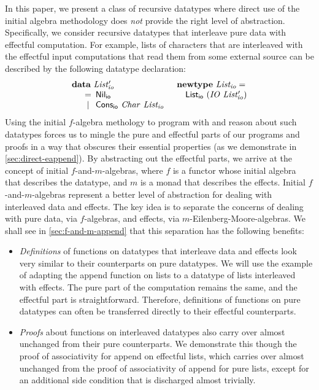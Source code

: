 \documentclass{jfp1}
\newcommand{\kw}[1]{\textbf{#1}}
\begin{document}
In this paper, we present a class of recursive datatypes where direct
use of the initial algebra methodology does \emph{not} provide the
right level of abstraction. Specifically, we consider recursive
datatypes that interleave pure data with effectful computation. For
example, lists of characters that are interleaved with the effectful
input computations that read them from some external source can be
described by the following datatype declaration:
\begin{displaymath}
  \begin{array}{ll}
    \kw{data}~\mathit{List'_{io}}
    &
    \kw{newtype}~\mathit{List_{io}} = 
    \\
    \quad
    \begin{array}[t]{c@{\hspace{0.5em}}l}
      = & \mathsf{Nil_{io}} \\
      | & \mathsf{Cons_{io}}~\mathit{Char}~\mathit{List_{io}} \\
    \end{array}
    &
    \quad \mathsf{List_{io}}~(\mathit{IO}~\mathit{List'_{io}})
  \end{array}
\end{displaymath}
Using the initial $f$-algebra methology to program with and reason
about such datatypes forces us to mingle the pure and effectful parts
of our programs and proofs in a way that obscures their essential
properties (as we demonstrate in \autoref{sec:direct-eappend}). By
abstracting out the effectful parts, we arrive at the concept of
initial $f$-and-$m$-algebras, where $f$ is a functor whose initial
algebra that describes the datatype, and $m$ is a monad that describes
the effects. Initial $f$-and-$m$-algebras represent a better level of
abstraction for dealing with interleaved data and effects. The key
idea is to separate the concerns of dealing with pure data, via
$f$-algebras, and effects, via $m$-Eilenberg-Moore-algebras. We shall
see in \autoref{sec:f-and-m-append} that this separation has the
following benefits:
\begin{itemize}
\item \emph{Definitions} of functions on datatypes that interleave
  data and effects look very similar to their counterparts on pure
  datatypes. We will use the example of adapting the append function
  on lists to a datatype of lists interleaved with effects. The pure
  part of the computation remains the same, and the effectful part is
  straightforward. Therefore, definitions of functions on pure
  datatypes can often be transferred directly to their effectful
  counterparts.
\item \emph{Proofs} about functions on interleaved datatypes also
  carry over almost unchanged from their pure counterparts. We
  demonstrate this though the proof of associativity for append on
  effectful lists, which carries over almost unchanged from the proof
  of associativity of append for pure lists, except for an additional
  side condition that is discharged almost trivially.
\end{itemize}
\end{document}
